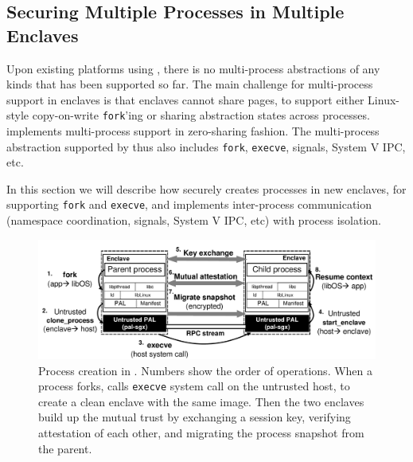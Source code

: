 \subsection{Securing Multiple Processes in Multiple Enclaves}
\label{sec:gsgx:multiproc}

Upon existing platforms using \sgx{}, there is no
multi-process abstractions of any kinds that has been supported so far.
The main challenge for multi-process support in enclaves
is that enclaves cannot share pages,
to support either Linux-style copy-on-write {\tt fork}'ing or
sharing abstraction states across processes.
\graphene{} implements multi-process support
in zero-sharing fashion.
The multi-process abstraction supported by \graphene{} thus also \sysname{}
includes {\tt fork}, {\tt execve}, signals, System V IPC, etc.

In this section we will describe how \sysname{} securely creates
processes in new enclaves,
for supporting {\tt fork} and {\tt execve},
and implements inter-process communication
(namespace coordination, signals, System V IPC, etc)
with process isolation.


\begin{figure}[t!]
\centering
\includegraphics[width=6.5in]{graphene-sgx/figures/fork.pdf}
\footnotesize
\caption[Process creation in \sysname{}]
{Process creation in \sysname{}.
Numbers show the order of operations.
When a process forks, \sysname{} calls {\tt execve} system call
on the untrusted host,
to create a clean enclave with the same \libos{} image.
Then the two enclaves build up the mutual trust by
exchanging a session key, verifying attestation of each other,
and migrating the process snapshot from the parent.}
\label{fig:gsgx:fork}
\end{figure}

